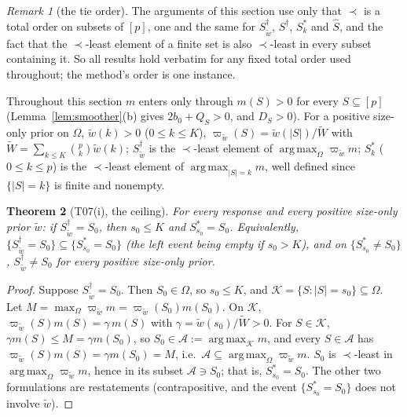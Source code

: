 \documentclass[11pt]{article}
\newtheorem{theorem}{Theorem}[section]
\theoremstyle{remark}
\newtheorem{remark}[theorem]{Remark}
\DeclareMathOperator*{\argmax}{arg\,max}
\begin{document}
\begin{remark}[the tie order]\label{rem:order}
The arguments of this section use only that $\prec$ is a total order on subsets of $[p]$, one and the same for $S^\dagger_{\tilde w}$, $S^\dagger$, $S^*_k$ and $\hat S$, and the fact that the $\prec$-least element of a finite set is also $\prec$-least in every subset containing it. So all results hold verbatim for any fixed total order used throughout; the method's order is one instance.
\end{remark}

Throughout this section $m$ enters only through $m(S)>0$ for every $S\subseteq[p]$ (Lemma~\ref{lem:smoother}(b) gives $2b_0+Q_S>0$, and $D_S>0$). For a positive size-only prior on $\Omega$, $\tilde w(k)>0$ ($0\le k\le K$), $\varpi_{\tilde w}(S)=\tilde w(|S|)/\tilde W$ with $\tilde W=\sum_{k\le K}\binom pk\tilde w(k)$; $S^\dagger_{\tilde w}$ is the $\prec$-least element of $\argmax_\Omega\varpi_{\tilde w}m$; $S^*_k$ ($0\le k\le p$) is the $\prec$-least element of $\argmax_{|S|=k}m$, well defined since $\{|S|=k\}$ is finite and nonempty.

\begin{theorem}[T07(i), the ceiling]\label{thm:ceiling}
For every response and every positive size-only prior $\tilde w$: if $S^\dagger_{\tilde w}=S_0$, then $s_0\le K$ and $S^*_{s_0}=S_0$. Equivalently, $\{S^\dagger_{\tilde w}=S_0\}\subseteq\{S^*_{s_0}=S_0\}$ (the left event being empty if $s_0>K$), and on $\{S^*_{s_0}\ne S_0\}$, $S^\dagger_{\tilde w}\ne S_0$ for every positive size-only prior.
\end{theorem}
\begin{proof}
Suppose $S^\dagger_{\tilde w}=S_0$. Then $S_0\in\Omega$, so $s_0\le K$, and $\mathcal K=\{S:|S|=s_0\}\subseteq\Omega$. Let $M=\max_\Omega\varpi_{\tilde w}m=\varpi_{\tilde w}(S_0)m(S_0)$. On $\mathcal K$, $\varpi_{\tilde w}(S)m(S)=\gamma\,m(S)$ with $\gamma=\tilde w(s_0)/\tilde W>0$. For $S\in\mathcal K$, $\gamma m(S)\le M=\gamma m(S_0)$, so $S_0\in\mathcal A:=\argmax_{\mathcal K}m$, and every $S\in\mathcal A$ has $\varpi_{\tilde w}(S)m(S)=\gamma m(S_0)=M$, i.e.\ $\mathcal A\subseteq\argmax_\Omega\varpi_{\tilde w}m$. $S_0$ is $\prec$-least in $\argmax_\Omega\varpi_{\tilde w}m$, hence in its subset $\mathcal A\ni S_0$; that is, $S^*_{s_0}=S_0$. The other two formulations are restatements (contrapositive, and the event $\{S^*_{s_0}=S_0\}$ does not involve $\tilde w$).
\end{proof}
\end{document}
